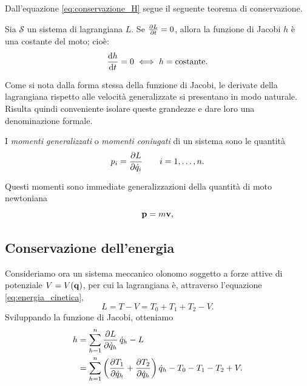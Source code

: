 Dall'equazione \eqref{eq:conservazione_H} segue il seguente teorema di conservazione.

\begin{theorem}
    Sia $\mathcal{S}$ un sistema di lagrangiana $L$. Se $\pdv{L}{t} = 0$, allora la funzione di Jacobi $h$ è una costante del moto; cioè:
    \begin{equation*}
        \dv{h}{t} = 0 \iff h = \text{costante}.
    \end{equation*}
\end{theorem}

Come si nota dalla forma stessa della funzione di Jacobi, le derivate della lagrangiana rispetto alle velocità generalizzate si presentano in modo naturale. Risulta quindi conveniente isolare queste grandezze e dare loro una denominazione formale.

\begin{definition}
    I \emph{momenti generalizzati} o \emph{momenti coniugati} di un sistema sono le quantità
    \begin{equation*}
        p_i = \pdv{L}{\dot{q}_i} \qquad i = 1, \dots, n.
    \end{equation*}
\end{definition}
Questi momenti sono immediate generalizzazioni della quantità di moto newtoniana
\begin{equation*}
    \vb{p} = m\vb{v},
\end{equation*}

\subsection{Conservazione dell'energia}
Consideriamo ora un sistema meccanico olonomo soggetto a forze attive di potenziale $V=V(\vb{q})$, per cui la lagrangiana è, attraverso l'equazione \eqref{eq:energia_cinetica},
\begin{equation*}
    L = T - V = T_0 + T_1 + T_2- V.
\end{equation*}
Sviluppando la funzione di Jacobi, otteniamo
\begin{align*}
    h &= \sum_{h=1}^n \pdv{L}{\dot{q}_h}\,\dot{q}_h - L \\
    &= \sum_{h=1}^n \left(\pdv{T_1}{\dot{q}_h} + \pdv{T_2}{\dot{q}_h}\right)\dot{q}_h - T_0 - T_1 - T_2 + V.
\end{align*}

